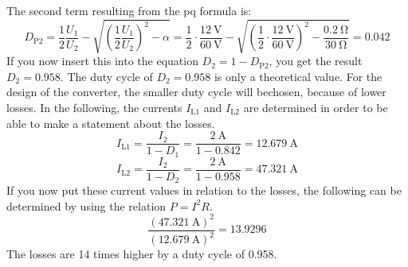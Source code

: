 \begin{solutionblock}
The second term resulting from the pq formula is:
\begin{equation}
    D_\mathrm{P2}=\frac{1}{2}\frac{U_\mathrm{1}}{U_\mathrm{2}}-\sqrt{(\frac{1}{2}\frac{U_\mathrm{1}}{U_\mathrm{2}})^2-\alpha}= \frac{1}{2}\cdot\frac{\SI{12}{\volt}}{\SI{60}{\volt}}-\sqrt{({\frac{1}{2}}\cdot\frac{\SI{12}{\volt}}{\SI{60}{\volt}})^2-\frac{\SI{0.2}{\ohm}}{\SI{30}{\ohm}}}= 0.042
\end{equation}
If you now insert this into the equation $D_\mathrm{2}=1-D_\mathrm{P2}$, you get the result $D_\mathrm{2}=0.958$.
The duty cycle of $D_\mathrm{2}=0.958$ is only a theoretical value. For the design of the converter, the smaller duty cycle will bechosen, because of lower losses.
In the following, the currents $I_\mathrm{L1}$ and $I_\mathrm{L2}$ are determined in order to be able to make a statement about the losses.
\begin{equation}
    I_\mathrm{L1} = \frac{I_\mathrm{2}}{1-D_\mathrm{1}}= \frac{\SI{2}{\ampere}}{1-0.842}=\SI{12.679}{\ampere}
\end{equation}
\begin{equation}
    I_\mathrm{L2} = \frac{I_\mathrm{2}}{1-D_\mathrm{2}}= \frac{\SI{2}{\ampere}}{1-0.958}=\SI{47.321}{\ampere}
\end{equation}
If you now put these current values in relation to the losses, the following can be determined by using the relation $P=I^2R$.
\begin{equation}
    \frac{(\SI{47.321}{\ampere})^2}{(\SI{12.679}{\ampere})^2}=13.9296
\end{equation}
The losses are 14 times higher by a duty cycle of 0.958.
\end{solutionblock}